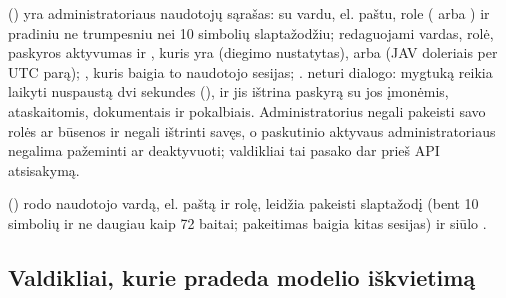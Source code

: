  () yra administratoriaus naudotojų sąrašas:
 su vardu, el. paštu, role ( arba ) ir
pradiniu ne trumpesniu nei 10 simbolių slaptažodžiu; redaguojami vardas, rolė, paskyros
aktyvumas ir , kuris yra  (diegimo nustatytas),
 arba  (JAV doleriais per UTC parą); , kuris
baigia to naudotojo sesijas; .  neturi
dialogo: mygtuką reikia laikyti nuspaustą dvi sekundes (), ir
jis ištrina paskyrą su jos įmonėmis, ataskaitomis, dokumentais ir pokalbiais. Administratorius
negali pakeisti savo rolės ar būsenos ir negali ištrinti savęs, o paskutinio aktyvaus administratoriaus
negalima pažeminti ar deaktyvuoti; valdikliai tai pasako dar prieš API atsisakymą.

 () rodo naudotojo vardą, el. paštą ir rolę, leidžia
pakeisti slaptažodį (bent 10 simbolių ir ne daugiau kaip 72 baitai; pakeitimas baigia kitas
sesijas) ir siūlo .

\subsection{Valdikliai, kurie pradeda modelio iškvietimą}\label{sec:console:modelbuttons}

